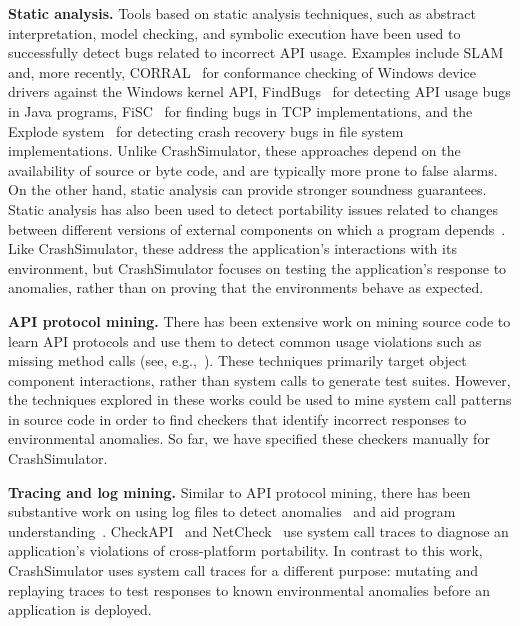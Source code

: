 \noindent 
{\bf Static analysis. }
Tools based on static analysis techniques, such as abstract interpretation,
model checking, and symbolic execution have been used to successfully
detect bugs related to incorrect API usage. Examples include
SLAM~\cite{Ball_adecade, Ball:2002:SLP:503272.503274} and, more recently,
CORRAL~\cite{DBLP:conf/sigsoft/LalQ14} for conformance checking of Windows
device drivers against the Windows kernel API,
FindBugs~\cite{DBLP:conf/oopsla/HovemeyerP04} for detecting API usage bugs
in Java programs, FiSC~\cite{Musuvathi04modelchecking} for finding bugs in
TCP implementations, and the Explode
system~\cite{Yang:2006:ELG:1298455.1298469} for detecting crash recovery
bugs in file system implementations. Unlike CrashSimulator, these
approaches depend on the availability of source or byte code, and are
typically more prone to false alarms. On the other hand, static analysis
can provide stronger soundness guarantees.  Static analysis has also been
used to detect portability issues related to changes between different
versions of external components on which a program
depends~\cite{silakov2010improving, javacompliance-www}. Like
CrashSimulator, these address the application's interactions with its
environment, but CrashSimulator focuses on testing the application's
response to anomalies, rather than on proving that the environments behave
as expected.

\iffalse
\noindent
{\bf Specification and run-time verification.}
Substantial work has been done in validating API and protocol behaviors,
e.g., finding faults in the Linux TCP implementation, SSH2 and
RCP~\cite{Udrea:2008}, BGP configuration~\cite{Feamster:2005}, and
identifying network vulnerabilities~\cite{ritchey-sp00}. 
\fi

\noindent
{\bf API protocol mining.}
There has been extensive work on mining source code to learn API protocols
and use them to detect common usage violations such as missing method calls
(see, e.g.,~\cite{mariani2007compatibility,
DBLP:journals/ase/WasylkowskiZ11, DBLP:conf/icse/PradelJAG12,
DBLP:journals/tosem/MonperrusM13, DBLP:conf/icse/JamrozikSZ16}). These
techniques primarily target object component interactions, rather than
system calls to generate test suites. However, the techniques explored in
these works could be used to mine system call patterns in source code in
order to find checkers that identify incorrect responses to environmental
anomalies. So far, we have specified these checkers manually for
CrashSimulator.

\noindent
{\bf Tracing and log mining.} 
Similar to API protocol mining, there has been substantive work on using
log files to detect anomalies~\cite{pinpoint,
jiang_abnormal_trace_detection_icac_2005, xu2009detecting, lou2010mining2}
and aid program understanding~\cite{yuan2010sherlog,
beschastnikh_synoptic_fse_2011, csight_icse_2014}.
CheckAPI~\cite{rasley2015detecting} and NetCheck~\cite{Zhuang_NSDI_2014}
use system call traces to diagnose an application's violations of
cross-platform portability.  In contrast to this work, CrashSimulator uses
system call traces for a different purpose: mutating and replaying traces
to test responses to known environmental anomalies before an application is
deployed.


